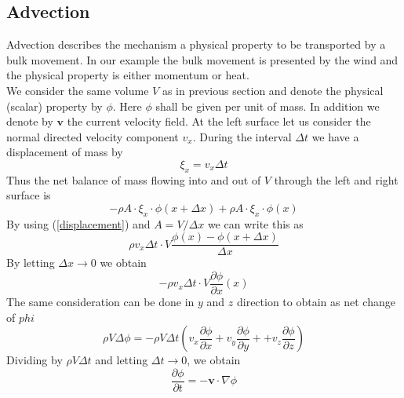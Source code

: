 \documentclass[]{article}
\begin{document}
\subsection{Advection}
Advection describes the mechanism a physical property to be transported by a bulk movement. In our example the bulk movement is presented by the wind and the physical property is either momentum or heat.\\
We consider the same volume $V$ as in previous section and denote the physical (scalar) property by $\phi$. Here $\phi$ shall be given per unit of mass. In addition we denote by $\textbf{v}$ the current velocity field. At the left surface let us consider the normal directed velocity component $v_x$. During the interval $\Delta t$ we have a displacement of mass by
\begin{equation} \label{displacement}
\xi_{x}=v_x\Delta t
\end{equation} 
Thus the net balance of mass flowing into and out of $V$ through the left and right surface is
\begin{equation} \label{net_flow}
-\rho A\cdot\xi_{x} \cdot \phi(x+\Delta x)+\rho A\cdot\xi_{x} \cdot \phi(x)
\end{equation}
By using (\ref{displacement}) and $A=V/\Delta x$ we can write this as
\begin{equation*}
\rho v_x\Delta t\cdot V \frac{\phi (x)-\phi(x+\Delta x)}{\Delta x}
\end{equation*}
By letting $\Delta x\rightarrow 0$ we obtain
\begin{equation*}
-\rho v_x\Delta t\cdot V \frac{\partial \phi}{\partial x}(x)
\end{equation*}
The same consideration can be done in $y$ and $z$ direction to obtain as net change of $phi$
\begin{equation*}
\rho V \Delta \phi = -\rho V \Delta t \left(v_x \frac{\partial \phi}{\partial x}+
 v_y \frac{\partial \phi}{\partial y}+
 +v_z \frac{\partial \phi}{\partial z}\right)
\end{equation*}
Dividing by $\rho V \Delta t$ and letting $\Delta t\rightarrow 0$, we obtain
\begin{equation} \label{transp_equation}
\frac{\partial\phi}{\partial t}=-\textbf{v}\cdot\nabla\phi
\end{equation}
\end{document}
